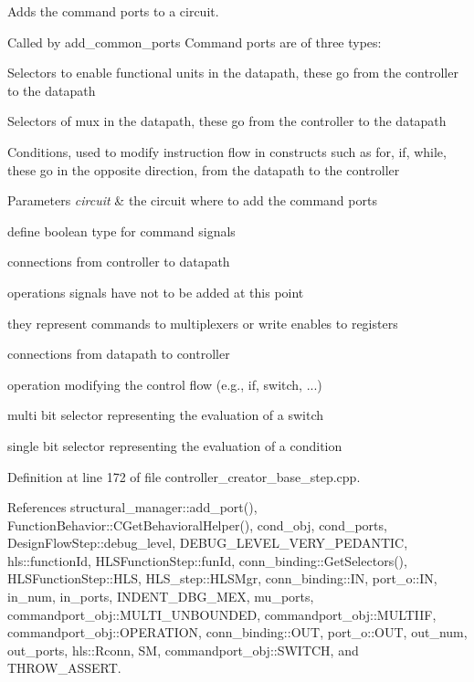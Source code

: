 Adds the command ports to a circuit. 

Called by add\+\_\+common\+\_\+ports Command ports are of three types\+:
\begin{DoxyItemize}
\item Selectors to enable functional units in the datapath, these go from the controller to the datapath
\item Selectors of mux in the datapath, these go from the controller to the datapath
\item Conditions, used to modify instruction flow in constructs such as for, if, while, these go in the opposite direction, from the datapath to the controller 
\begin{DoxyParams}{Parameters}
{\em circuit} & the circuit where to add the command ports \\
\hline
\end{DoxyParams}

\end{DoxyItemize}define boolean type for command signals

connections from controller to datapath

operations signals have not to be added at this point

they represent commands to multiplexers or write enables to registers

connections from datapath to controller

operation modifying the control flow (e.\+g., if, switch, ...)

multi bit selector representing the evaluation of a switch

single bit selector representing the evaluation of a condition 

Definition at line 172 of file controller\+\_\+creator\+\_\+base\+\_\+step.\+cpp.



References structural\+\_\+manager\+::add\+\_\+port(), Function\+Behavior\+::\+C\+Get\+Behavioral\+Helper(), cond\+\_\+obj, cond\+\_\+ports, Design\+Flow\+Step\+::debug\+\_\+level, D\+E\+B\+U\+G\+\_\+\+L\+E\+V\+E\+L\+\_\+\+V\+E\+R\+Y\+\_\+\+P\+E\+D\+A\+N\+T\+IC, hls\+::function\+Id, H\+L\+S\+Function\+Step\+::fun\+Id, conn\+\_\+binding\+::\+Get\+Selectors(), H\+L\+S\+Function\+Step\+::\+H\+LS, H\+L\+S\+\_\+step\+::\+H\+L\+S\+Mgr, conn\+\_\+binding\+::\+IN, port\+\_\+o\+::\+IN, in\+\_\+num, in\+\_\+ports, I\+N\+D\+E\+N\+T\+\_\+\+D\+B\+G\+\_\+\+M\+EX, mu\+\_\+ports, commandport\+\_\+obj\+::\+M\+U\+L\+T\+I\+\_\+\+U\+N\+B\+O\+U\+N\+D\+ED, commandport\+\_\+obj\+::\+M\+U\+L\+T\+I\+IF, commandport\+\_\+obj\+::\+O\+P\+E\+R\+A\+T\+I\+ON, conn\+\_\+binding\+::\+O\+UT, port\+\_\+o\+::\+O\+UT, out\+\_\+num, out\+\_\+ports, hls\+::\+Rconn, SM, commandport\+\_\+obj\+::\+S\+W\+I\+T\+CH, and T\+H\+R\+O\+W\+\_\+\+A\+S\+S\+E\+RT.



